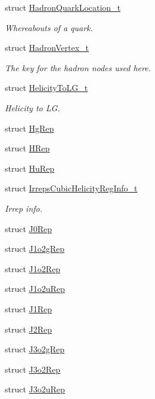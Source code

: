 \begin{DoxyCompactItemize}
struct \mbox{\hyperlink{structHadron_1_1HadronQuarkLocation__t}{Hadron\+Quark\+Location\+\_\+t}}
\begin{DoxyCompactList}\small\item\em Whereabouts of a quark. \end{DoxyCompactList}\item 
struct \mbox{\hyperlink{structHadron_1_1HadronVertex__t}{Hadron\+Vertex\+\_\+t}}
\begin{DoxyCompactList}\small\item\em The key for the hadron nodes used here. \end{DoxyCompactList}\item 
struct \mbox{\hyperlink{structHadron_1_1HelicityToLG__t}{Helicity\+To\+L\+G\+\_\+t}}
\begin{DoxyCompactList}\small\item\em Helicity to LG. \end{DoxyCompactList}\item 
struct \mbox{\hyperlink{structHadron_1_1HgRep}{Hg\+Rep}}
\item 
struct \mbox{\hyperlink{structHadron_1_1HRep}{H\+Rep}}
\item 
struct \mbox{\hyperlink{structHadron_1_1HuRep}{Hu\+Rep}}
\item 
struct \mbox{\hyperlink{structHadron_1_1IrrepsCubicHelicityRegInfo__t}{Irreps\+Cubic\+Helicity\+Reg\+Info\+\_\+t}}
\begin{DoxyCompactList}\small\item\em Irrep info. \end{DoxyCompactList}\item 
struct \mbox{\hyperlink{structHadron_1_1J0Rep}{J0\+Rep}}
\item 
struct \mbox{\hyperlink{structHadron_1_1J1o2gRep}{J1o2g\+Rep}}
\item 
struct \mbox{\hyperlink{structHadron_1_1J1o2Rep}{J1o2\+Rep}}
\item 
struct \mbox{\hyperlink{structHadron_1_1J1o2uRep}{J1o2u\+Rep}}
\item 
struct \mbox{\hyperlink{structHadron_1_1J1Rep}{J1\+Rep}}
\item 
struct \mbox{\hyperlink{structHadron_1_1J2Rep}{J2\+Rep}}
\item 
struct \mbox{\hyperlink{structHadron_1_1J3o2gRep}{J3o2g\+Rep}}
\item 
struct \mbox{\hyperlink{structHadron_1_1J3o2Rep}{J3o2\+Rep}}
\item 
struct \mbox{\hyperlink{structHadron_1_1J3o2uRep}{J3o2u\+Rep}}

\end{DoxyCompactItemize}
